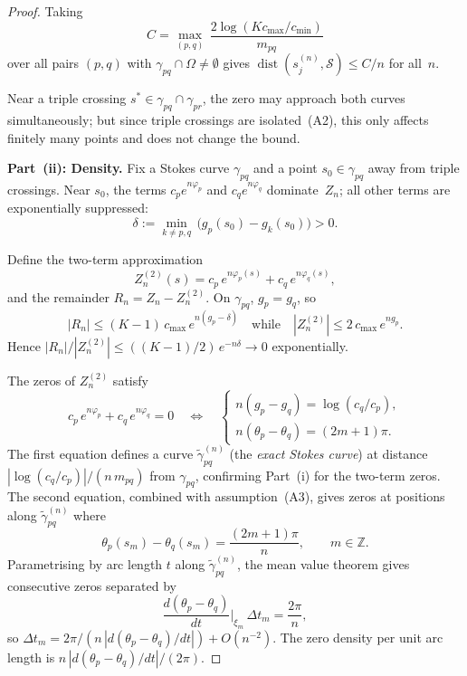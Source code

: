 \documentclass[12pt]{article}
\theoremstyle{definition}
\theoremstyle{remark}
\newcommand{\dist}{\operatorname{dist}}
\begin{document}
\begin{proof}
Taking
\[
C = \max_{(p,q)}\, \frac{2\log(Kc_{\max}/c_{\min})}{m_{pq}}
\]
over all pairs $(p,q)$ with $\gamma_{pq} \cap \Omega \neq \emptyset$
gives $\dist(s_j^{(n)}, \mathcal{S}) \leq C/n$ for all~$n$.

Near a triple crossing $s^* \in \gamma_{pq} \cap \gamma_{pr}$, the
zero may approach both curves simultaneously; but since triple
crossings are isolated~(A2), this only affects finitely many points
and does not change the bound.

\medskip
\textbf{Part~(ii): Density.}
Fix a Stokes curve $\gamma_{pq}$ and a point $s_0 \in \gamma_{pq}$
away from triple crossings.  Near $s_0$, the terms $c_p e^{n\varphi_p}$
and $c_q e^{n\varphi_q}$ dominate~$Z_n$; all other terms are
exponentially suppressed:
\[
\delta := \min_{k \neq p,q}\,\bigl(g_p(s_0) - g_k(s_0)\bigr) > 0.
\]

Define the two-term approximation
\[
Z_n^{(2)}(s) = c_p\,e^{n\varphi_p(s)} + c_q\,e^{n\varphi_q(s)},
\]
and the remainder $R_n = Z_n - Z_n^{(2)}$.  On $\gamma_{pq}$,
$g_p = g_q$, so
\[
|R_n| \leq (K{-}1)\,c_{\max}\,e^{n(g_p - \delta)}
\quad\text{while}\quad
|Z_n^{(2)}| \leq 2\,c_{\max}\,e^{ng_p}.
\]
Hence $|R_n|/|Z_n^{(2)}| \leq ((K{-}1)/2)\,e^{-n\delta} \to 0$
exponentially.

The zeros of $Z_n^{(2)}$ satisfy
\begin{equation}\label{eq:2term_zero}
c_p\,e^{n\varphi_p} + c_q\,e^{n\varphi_q} = 0
\quad\Longleftrightarrow\quad
\begin{cases}
n(g_p - g_q) = \log(c_q/c_p), \\[3pt]
n(\theta_p - \theta_q) = (2m+1)\pi.
\end{cases}
\end{equation}
The first equation defines a curve $\tilde\gamma_{pq}^{(n)}$
(the \emph{exact Stokes curve}) at distance $|\log(c_q/c_p)|/(n\,m_{pq})$
from $\gamma_{pq}$, confirming Part~(i) for the two-term zeros.
The second equation, combined with assumption~(A3), gives zeros at
positions along $\tilde\gamma_{pq}^{(n)}$ where
\begin{equation}\label{eq:ym}
\theta_p(s_m) - \theta_q(s_m) = \frac{(2m+1)\pi}{n},
\qquad m \in \mathbb{Z}.
\end{equation}
Parametrising by arc length $t$ along $\tilde\gamma_{pq}^{(n)}$,
the mean value theorem gives consecutive zeros separated by
\begin{equation}\label{eq:spacing}
\frac{d(\theta_p - \theta_q)}{dt}\bigg|_{\xi_m}\,\Delta t_m
= \frac{2\pi}{n},
\end{equation}
so $\Delta t_m = 2\pi/(n\,|d(\theta_p - \theta_q)/dt|) + O(n^{-2})$.
The zero density per unit arc length is
$n\,|d(\theta_p - \theta_q)/dt|/(2\pi)$.


\end{proof}
\end{document}
